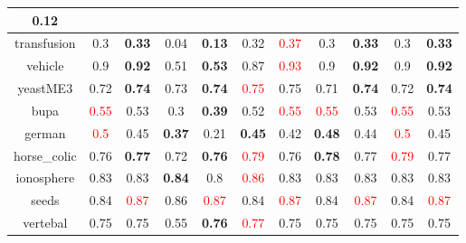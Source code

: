 \documentclass{article}%
\begin{document}
\begin{tabular}{c|cccccccccc}
{0.12
}\\%
\hline%
transfusion&0.3&\textbf{0.33}&0.04&\textbf{0.13}&0.32&\textcolor{red}{ 
0.37
}&0.3&\textbf{0.33}&0.3&\textbf{0.33}\\%
\hline%
vehicle&0.9&\textbf{0.92}&0.51&\textbf{0.53}&0.87&\textcolor{red}{ 
0.93
}&0.9&\textbf{0.92}&0.9&\textbf{0.92}\\%
\hline%
yeastME3&0.72&\textbf{0.74}&0.73&\textbf{0.74}&\textcolor{red}{ 
0.75
}&0.75&0.71&\textbf{0.74}&0.72&\textbf{0.74}\\%
\hline%
bupa&\textcolor{red}{ 
0.55
}&0.53&0.3&\textbf{0.39}&0.52&\textcolor{red}{ 
0.55
}&\textcolor{red}{ 
0.55
}&0.53&\textcolor{red}{ 
0.55
}&0.53\\%
\hline%
german&\textcolor{red}{ 
0.5
}&0.45&\textbf{0.37}&0.21&\textbf{0.45}&0.42&\textbf{0.48}&0.44&\textcolor{red}{ 
0.5
}&0.45\\%
\hline%
horse\_colic&0.76&\textbf{0.77}&0.72&\textbf{0.76}&\textcolor{red}{ 
0.79
}&0.76&\textbf{0.78}&0.77&\textcolor{red}{ 
0.79
}&0.77\\%
\hline%
ionosphere&0.83&0.83&\textbf{0.84}&0.8&\textcolor{red}{ 
0.86
}&0.83&0.83&0.83&0.83&0.83\\%
\hline%
seeds&0.84&\textcolor{red}{ 
0.87
}&0.86&\textcolor{red}{ 
0.87
}&0.84&\textcolor{red}{ 
0.87
}&0.84&\textcolor{red}{ 
0.87
}&0.84&\textcolor{red}{ 
0.87
}\\%
\hline%
vertebal&0.75&0.75&0.55&\textbf{0.76}&\textcolor{red}{ 
0.77
}&0.75&0.75&0.75&0.75&0.75\\%
\hline%
\end{tabular}

%
\end{document}

